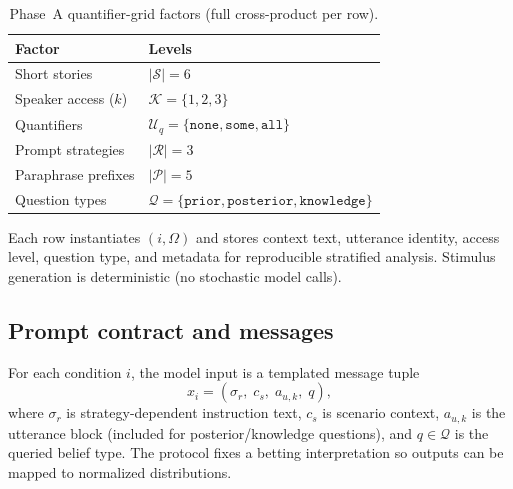 \documentclass[11pt]{article}
\begin{document}
\begin{table}[H]

  \centering

  \footnotesize

  \setlength{\tabcolsep}{3pt}

  \renewcommand{\arraystretch}{0.92}

  \begin{tabularx}{\linewidth}{@{}lX@{}}

    \toprule

    \textbf{Factor} & \textbf{Levels} \\

    \midrule

    Short stories & $|\mathcal{S}|=6$ \\

    Speaker access ($k$) & $\mathcal{K}=\{1,2,3\}$ \\

    Quantifiers & $\mathcal{U}_q=\{\texttt{none},\texttt{some},\texttt{all}\}$ \\

    Prompt strategies & $|\mathcal{R}|=3$ \\

    Paraphrase prefixes & $|\mathcal{P}|=5$ \\

    Question types & $\mathcal{Q}=\{\texttt{prior},\texttt{posterior},\texttt{knowledge}\}$ \\

    \bottomrule

  \end{tabularx}

  \caption{Phase~A quantifier-grid factors (full cross-product per row).}

  \label{tab:experimental_design}

\end{table}



Each row instantiates $(i,\Omega)$ and stores context text, utterance identity, access level, question type, and metadata for reproducible stratified analysis. Stimulus generation is deterministic (no stochastic model calls).



\subsection{Prompt contract and messages}

For each condition $i$, the model input is a templated message tuple
\[
x_i=(\sigma_r,\;c_s,\;a_{u,k},\;q),
\]
where $\sigma_r$ is strategy-dependent instruction text, $c_s$ is scenario context, $a_{u,k}$ is the utterance block (included for posterior/knowledge questions), and $q\in\mathcal{Q}$ is the queried belief type. The protocol fixes a betting interpretation so outputs can be mapped to normalized distributions.
\end{document}
